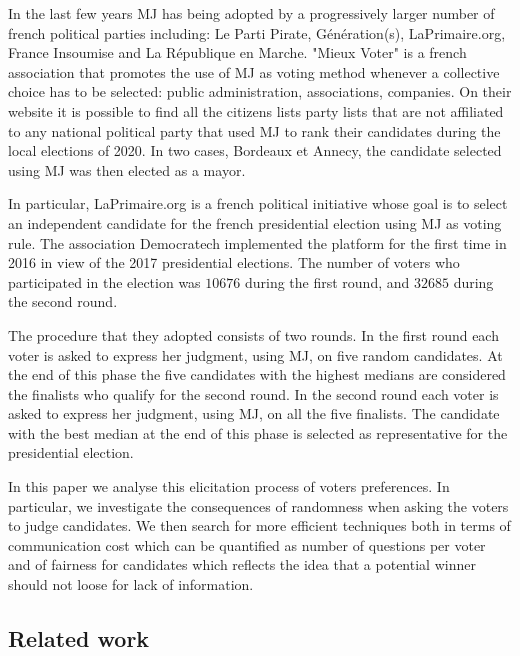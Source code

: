 In the last few years \ac{MJ} has being adopted by a progressively larger number of french political parties including: Le Parti Pirate, Génération(s), LaPrimaire.org, France Insoumise and La République en Marche.
"Mieux Voter" \citep{MV} is a french association that promotes the use of \ac{MJ} as voting method whenever a collective choice has to be selected: public administration, associations, companies. On their website it is possible to find all the citizens lists \textendash party lists that are not affiliated to any national political party \textemdash that used \ac{MJ} to rank their candidates during the local elections of 2020. In two cases, Bordeaux et Annecy, the candidate selected using \ac{MJ} was then elected as a mayor. 

In particular, LaPrimaire.org \citep{LaPrimaire} is a french political initiative whose goal is to select an independent candidate for the french presidential election using \ac{MJ} as voting rule. The association Democratech implemented the platform for the first time in 2016 in view of the 2017 presidential elections. The number of voters who participated in the election was $10676$ during the first round, and $32685$ during the second round.

The procedure that they adopted consists of two rounds. In the first round each voter is asked to express her judgment, using \ac{MJ}, on five random candidates. At the end of this phase the five candidates with the highest medians are considered the finalists who qualify for the second round. In the second round each voter is asked to express her judgment, using \ac{MJ}, on all the five finalists. The candidate with the best median at the end of this phase is selected as representative for the presidential election.

In this paper we analyse this elicitation process of voters preferences. In particular, we investigate the consequences of randomness when asking the voters to judge candidates. We then search for more efficient techniques both in terms of communication cost \textemdash which can be quantified as number of questions per voter \textemdash and of fairness for candidates \textemdash which reflects the idea that a potential winner should not loose for lack of information.


\subsection{Related work}

